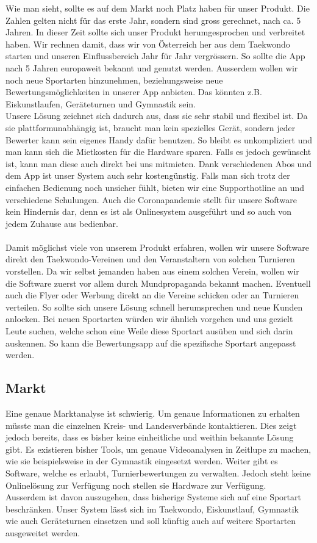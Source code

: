 Wie man sieht, sollte es auf dem Markt noch Platz haben für unser Produkt.
Die Zahlen gelten nicht für das erste Jahr, sondern sind gross gerechnet, nach ca. 5 Jahren.
In dieser Zeit sollte sich unser Produkt herumgesprochen und verbreitet haben.
Wir rechnen damit, dass wir von Österreich her aus dem Taekwondo starten und unseren Einflussbereich Jahr für Jahr vergrössern. So sollte die App nach 5 Jahren europaweit bekannt und genutzt werden.
Ausserdem wollen wir noch neue Sportarten hinzunehmen, beziehungsweise neue Bewertungsmöglichkeiten in unserer App anbieten.
Das könnten z.B. Eiskunstlaufen, Geräteturnen und Gymnastik sein.
\\
Unsere Lösung zeichnet sich dadurch aus, dass sie sehr stabil und flexibel ist.
Da sie plattformunabhängig ist, braucht man kein spezielles Gerät, sondern jeder Bewerter kann sein eigenes Handy dafür benutzen.
So bleibt es unkompliziert und man kann sich die Mietkosten für die Hardware sparen.
Falls es jedoch gewünscht ist, kann man diese auch direkt bei uns mitmieten.
Dank verschiedenen Abos und dem App ist unser System auch sehr kostengünstig.
Falls man sich trotz der einfachen Bedienung noch unsicher fühlt, bieten wir eine Supporthotline an und verschiedene Schulungen.
Auch die Coronapandemie stellt für unsere Software kein Hindernis dar, denn es ist als Onlinesystem ausgeführt und so auch von jedem Zuhause aus bedienbar.
\\\\
Damit möglichst viele von unserem Produkt erfahren, wollen wir unsere Software direkt den Taekwondo-Vereinen und den Veranstaltern von solchen Turnieren vorstellen.
Da wir selbst jemanden haben aus einem solchen Verein, wollen wir die Software zuerst vor allem durch Mundpropaganda bekannt machen.
Eventuell auch die Flyer oder Werbung direkt an die Vereine schicken oder an Turnieren verteilen.
So sollte sich unsere Lösung schnell herumsprechen und neue Kunden anlocken.
Bei neuen Sportarten würden wir ähnlich vorgehen und uns gezielt Leute suchen, welche schon eine Weile diese Sportart ausüben und sich darin auskennen.
So kann die Bewertungsapp auf die spezifische Sportart angepasst werden.

\subsection{Markt}
Eine genaue Marktanalyse ist schwierig. Um genaue Informationen zu erhalten müsste man die einzelnen Kreis- und Landesverbände kontaktieren. Dies zeigt jedoch bereits, dass es bisher keine einheitliche und weithin bekannte Lösung gibt. Es existieren bisher Tools, um genaue Videoanalysen in Zeitlupe zu machen, wie sie beispielsweise in der Gymnastik eingesetzt werden. Weiter gibt es Software, welche es erlaubt, Turnierbewertungen zu verwalten. Jedoch steht keine Onlinelösung zur Verfügung noch stellen sie Hardware zur Verfügung.\\  
Ausserdem ist davon auszugehen, dass bisherige Systeme sich auf eine Sportart beschränken. Unser System lässt sich im Taekwondo, Eiskunstlauf, Gymnastik wie auch Geräteturnen einsetzen und soll künftig auch auf weitere Sportarten ausgeweitet werden.  

